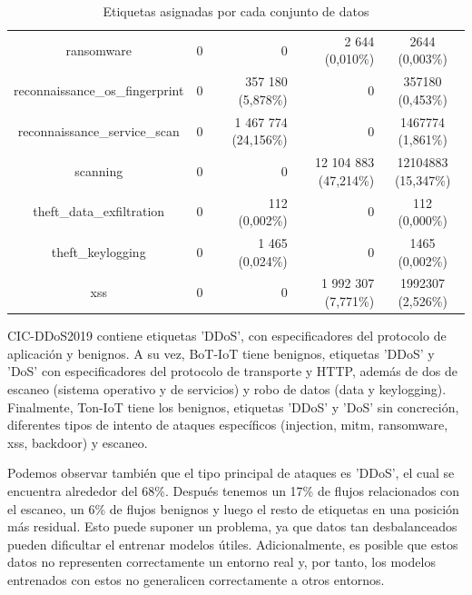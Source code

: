 \begin{table}[H]
{\begin{tabular}{|c | r r r | c |}
            ransomware                      &                     0            &                0            &            2 644 (0,010\%)  &   2644 (0,003\%) \\
            reconnaissance\_os\_fingerprint &                     0            &          357 180 (5,878\%)  &                0            &   357180 (0,453\%) \\
            reconnaissance\_service\_scan   &                     0            &        1 467 774 (24,156\%) &                0            &   1467774 (1,861\%) \\
            scanning                        &                     0            &                0            &       12 104 883 (47,214\%) &   12104883 (15,347\%) \\
            theft\_data\_exfiltration       &                     0            &              112 (0,002\%)  &                0            &   112 (0,000\%) \\
            theft\_keylogging               &                     0            &            1 465 (0,024\%)  &                0            &   1465 (0,002\%) \\
            xss                             &                     0            &                0            &        1 992 307 (7,771\%)  &   1992307 (2,526\%) \\
            \hline
        \end{tabular}
    }
    \caption{Etiquetas asignadas por cada conjunto de datos}
    \label{table:packetpincerassignedlabels}
\end{table}

CIC-DDoS2019 contiene etiquetas 'DDoS', con especificadores del protocolo de aplicación y benignos. A su vez, BoT-IoT tiene benignos, etiquetas 'DDoS' y 'DoS' con especificadores del protocolo de transporte y HTTP, además de dos de escaneo (sistema operativo y de servicios) y robo de datos (data y keylogging). Finalmente, Ton-IoT tiene los benignos, etiquetas 'DDoS' y 'DoS' sin concreción, diferentes tipos de intento de ataques específicos (injection, mitm, ransomware, xss, backdoor) y escaneo.

Podemos observar también que el tipo principal de ataques es 'DDoS', el cual se encuentra alrededor del 68\%. Después tenemos un 17\% de flujos relacionados con el escaneo, un 6\% de flujos benignos y luego el resto de etiquetas en una posición más residual. Esto puede suponer un problema, ya que datos tan desbalanceados pueden dificultar el entrenar modelos útiles. Adicionalmente, es posible que estos datos no representen correctamente un entorno real y, por tanto, los modelos entrenados con estos no generalicen correctamente a otros entornos.

